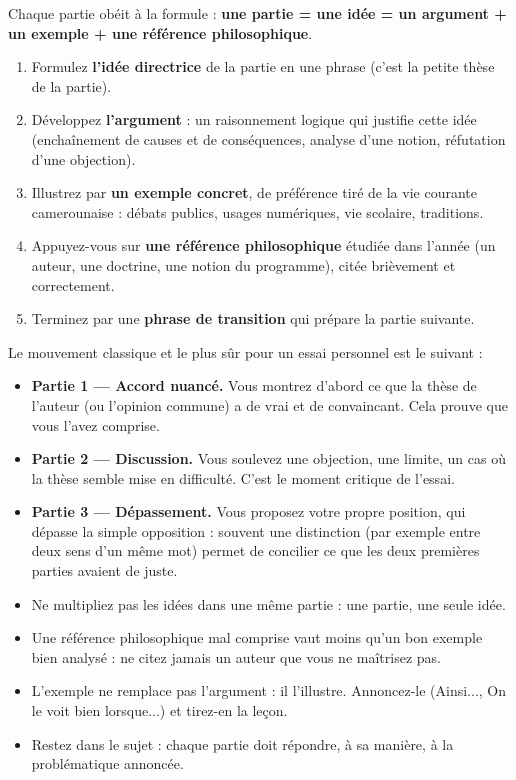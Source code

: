 \documentclass[11pt]{article}
\begin{document}
\begin{methode}
Chaque partie obéit à la formule : \textbf{une partie = une idée = un argument + un exemple + une référence philosophique}.
\begin{enumerate}
\item Formulez \textbf{l'idée directrice} de la partie en une phrase (c'est la petite thèse de la partie).
\item Développez \textbf{l'argument} : un raisonnement logique qui justifie cette idée (enchaînement de causes et de conséquences, analyse d'une notion, réfutation d'une objection).
\item Illustrez par \textbf{un exemple concret}, de préférence tiré de la vie courante camerounaise : débats publics, usages numériques, vie scolaire, traditions.
\item Appuyez-vous sur \textbf{une référence philosophique} étudiée dans l'année (un auteur, une doctrine, une notion du programme), citée brièvement et correctement.
\item Terminez par une \textbf{phrase de transition} qui prépare la partie suivante.
\end{enumerate}
\end{methode}

Le mouvement classique et le plus sûr pour un essai personnel est le suivant :

\begin{itemize}
\item \textbf{Partie 1 — Accord nuancé.} Vous montrez d'abord ce que la thèse de l'auteur (ou l'opinion commune) a de vrai et de convaincant. Cela prouve que vous l'avez comprise.
\item \textbf{Partie 2 — Discussion.} Vous soulevez une objection, une limite, un cas où la thèse semble mise en difficulté. C'est le moment critique de l'essai.
\item \textbf{Partie 3 — Dépassement.} Vous proposez votre propre position, qui dépasse la simple opposition : souvent une distinction (par exemple entre deux sens d'un même mot) permet de concilier ce que les deux premières parties avaient de juste.
\end{itemize}

\begin{attention}
\begin{itemize}
\item Ne multipliez pas les idées dans une même partie : une partie, une seule idée.
\item Une référence philosophique mal comprise vaut moins qu'un bon exemple bien analysé : ne citez jamais un auteur que vous ne maîtrisez pas.
\item L'exemple ne remplace pas l'argument : il l'illustre. Annoncez-le (\og Ainsi...\fg{}, \og On le voit bien lorsque...\fg{}) et tirez-en la leçon.
\item Restez dans le sujet : chaque partie doit répondre, à sa manière, à la problématique annoncée.
\end{itemize}
\end{attention}
\end{document}
